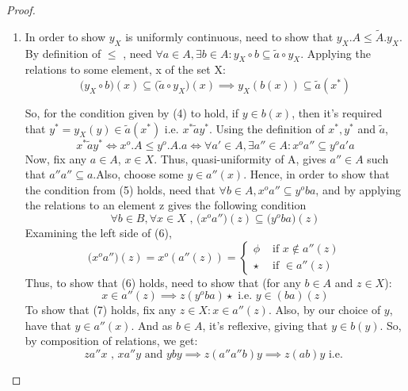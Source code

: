 \documentclass[18pt,a4paper]{article}
\theoremstyle{definition}
\begin{document}
\begin{proof}\setcounter{equation}{0}

\item \begin{enumerate}[label=(\alph*)]
	\item In order to show $y_X$ is uniformly continuous, need to show that $y_X.A \leq \tilde{A}.y_X $.
		By definition of $\leq$ , need $\forall a\in A, \exists b \in A:
		y_X \circ b \subseteq \tilde{a} \circ y_X $. Applying the relations
		to some element, x of the set X:
		\begin{equation} \big(y_X \circ b\big)(x) \subseteq \big( \tilde{a} \circ y_X\big)(x) \implies
		y_X(b(x)) \subseteq \tilde{a}(x^*) \end{equation}

		So, for the condition given by (4) to hold, if $y \in b(x)$, then it's required that
		$y^*=y_X(y) \in \tilde{a} (x^*)$ i.e. $x^* \tilde{a}y^*$. Using the definition of $x^*,y^*$
		and $\tilde{a}$,
		\begin{equation} x^* \tilde{a}y^* \iff x^o.A\leq y^o.A.a \iff
		\forall a' \in A, \exists a'' \in A: x^oa'' \subseteq y^oa'a  \end{equation}
		Now, fix any $a \in A$, $x\in X$. Thus, quasi-uniformity of A, gives $a'' \in A$ such that
		$a''a''\subseteq a$.Also, choose some $y \in a''(x)$. Hence, in
		order to show that the condition from (5) holds, need that
		$\forall b \in A, x^o a'' \subseteq y^oba$, and by applying the relations to an element z
		gives the following condition
		\begin{equation} \forall b \in B, \forall x \in X \text{ , }
		\big(x^oa''\big)(z) \subseteq \big(y^oba\big)(z) \end{equation}
		Examining the left side of (6),
		\[ \big( x^oa''\big)(z)=x^o (a''(z))= \begin{cases}
			\phi &\text{ if } x \notin a''(z) \\
			\star & \text{ if } \in a''(z)
		\end{cases} \]
		Thus, to show that (6) holds, need to show that (for any $b\in A$ and $z \in X$):
		\begin{equation} x \in a''(z) \implies z(y^oba)\star \text{ i.e. } y\in(ba)(z)
		\end{equation}
		To show that (7) holds, fix any $z\in X: x \in a''(z)$. Also, by our choice of $y$,
		have that $y \in a''(x)$. And as $b\in A$, it's reflexive, giving that $y \in b(y)$.
		So, by composition of relations, we get:
		\[ za''x \text{ , }  xa''y \text{ and } yby \implies z(a''a''b)y \implies z(ab)y \text{ i.e. }
\]
\end{enumerate}
\end{proof}
\end{document}
